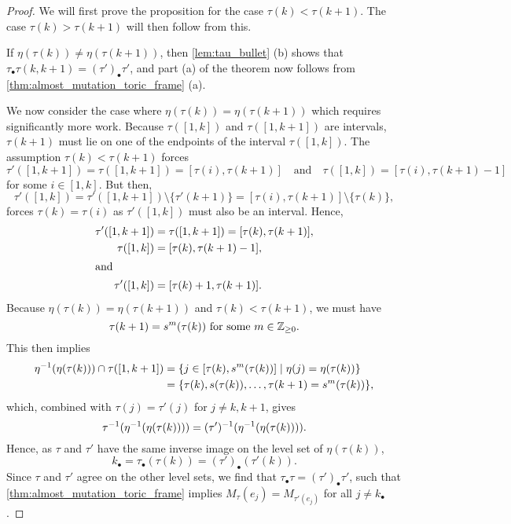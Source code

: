 \begin{proof}

	We will first prove the proposition for the case $\tau(k) < \tau(k+1)$. The case
	$\tau(k) > \tau(k+1)$ will then follow from this.

	If $\eta(\tau(k)) \neq \eta(\tau(k+1))$, then \cref{lem:tau_bullet} (b) shows that
	$\tau_\bullet \tau (k, k+1) = (\tau')_\bullet \tau'$, and part (a) of the theorem now
	follows from \cref{thm:almost_mutation_toric_frame} (a).

	We now consider the case where $\eta(\tau(k)) = \eta(\tau(k+1))$ which requires
	significantly more work. Because $\tau([1, k])$ and $\tau([1, k+1])$ are intervals,
	$\tau(k+1)$ must lie on one of the endpoints of the interval $\tau([1, k])$. The
	assumption $\tau(k) < \tau(k+1)$ forces
	\begin{equation*}
		\tau'([1, k+1]) = \tau([1, k+1]) = [\tau(i), \tau(k+1)] \quad \text{and}\quad \tau([1, k]) = [\tau(i), \tau(k+1) - 1]
	\end{equation*}
	for some $i\in [1, k]$. But then,
	\begin{equation*}
		\tau'([1, k]) = \tau'([1, k+1])\setminus\{\tau'(k+1)\} = [\tau(i), \tau(k+1)] \setminus \{\tau(k)\},
	\end{equation*}
	forces $\tau(k) = \tau(i)$ as $\tau'([1, k])$ must also be an interval. Hence,
	\begin{align*}
		\tau'([1, k+1]) & = \tau([1, k+1]) = [\tau(k), \tau(k+1)], \\
		\tau([1, k])    & = [\tau(k), \tau(k+1) - 1],              \\
		\shortintertext{and}
		\tau'([1, k])   & = [\tau(k) + 1, \tau(k+1)].
	\end{align*}
	Because $\eta(\tau(k)) = \eta(\tau(k+1))$ and $\tau(k) < \tau(k+1)$, we must have
	\begin{equation*}
		\tau(k+1) = s^m(\tau(k)) \text{ for some } m \in \mathbb{Z}_{\geq 0}.
	\end{equation*}
	This then implies
	\begin{equation}\label{eq:level_set_tau_k}
		\begin{aligned}
			\eta^{-1}(\eta(\tau(k))) \cap \tau([1, k+1])
			 & = \{j \in [\tau(k), s^m(\tau(k))] \mid \eta(j) = \eta(\tau(k))\} \\
			 & = \{\tau(k), s(\tau(k)), \dots, \tau(k+1) = s^m(\tau(k))\},
		\end{aligned}
	\end{equation}
	which, combined with $\tau(j) = \tau'(j)$ for $j\neq k, k+1$, gives
	\begin{equation*}
		\tau^{-1}(\eta^{-1}(\eta(\tau(k)))) = (\tau')^{-1}(\eta^{-1}(\eta(\tau(k)))).
	\end{equation*}
	Hence, as $\tau$ and $\tau'$ have the same inverse image on the level set of
	$\eta(\tau(k))$,
	\begin{equation*}
		k_\bullet = \tau_\bullet(\tau(k)) = (\tau')_\bullet(\tau'(k)).
	\end{equation*}
	Since $\tau$ and $\tau'$ agree on the other level sets, we find that $\tau_\bullet \tau
		= (\tau')_\bullet \tau'$, such that \cref{thm:almost_mutation_toric_frame} implies
	$M_\tau(e_j) = M_{\tau'(e_j)}$ for all $j \neq k_\bullet$.


\end{proof}
